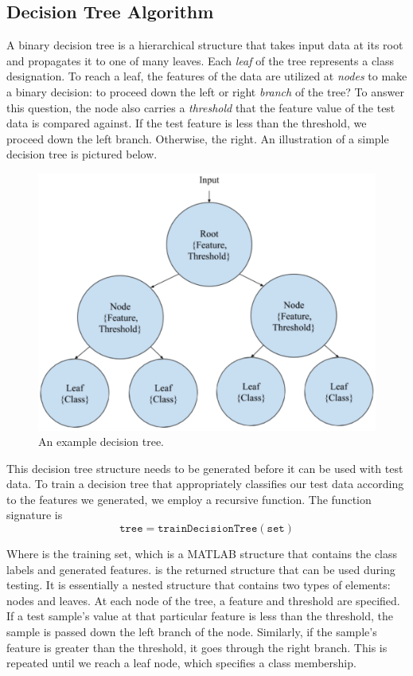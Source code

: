 \subsection{Decision Tree Algorithm}

A binary decision tree is a hierarchical structure that takes input data at its root and propagates it to one of many leaves. Each \emph{leaf} of the tree represents a class designation. To reach a leaf, the features of the data are utilized at \emph{nodes} to make a binary decision: to proceed down the left or right \emph{branch} of the tree? To answer this question, the node also carries a \emph{threshold} that the feature value of the test data is compared against. If the test feature is less than the threshold, we proceed down the left branch. Otherwise, the right. An illustration of a simple decision tree is pictured below.
%
\begin{figure}[H]
  \centering\includegraphics[width=0.5\columnwidth]{../images/decision_tree}
  \caption{An example decision tree.}
\end{figure}

This decision tree structure needs to be generated before it can be used with test data. To train a decision tree that appropriately classifies our test data according to the features we generated, we employ a recursive function. The function signature is
%
\begin{equation*}
  \mathtt{tree = trainDecisionTree(set)}
\end{equation*}

Where  is the training set, which is a MATLAB structure that contains the class labels and generated features.  is the returned structure that can be used during testing. It is essentially a nested structure that contains two types of elements: nodes and leaves. At each node of the tree, a feature and threshold are specified. If a test sample's value at that particular feature is less than the threshold, the sample is passed down the left branch of the node. Similarly, if the sample's feature is greater than the threshold, it goes through the right branch. This is repeated until we reach a leaf node, which specifies a class membership. 

